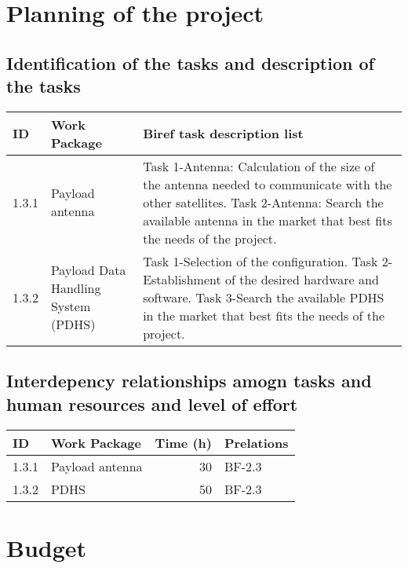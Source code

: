 \documentclass[12pt, titlepage]{article}
\begin{document}
\maketitle

\pagebreak


\section{Planning of the project}


\subsection{Identification of the tasks and description of the tasks}
\begin{tabular}{ | l | l | p{7cm} |}
\hline
ID & Work Package & Biref task description list\\ \hline
1.3.1 & Payload antenna &  Task 1-Antenna: Calculation of the size of the antenna needed to communicate with the other satellites. \newline
Task 2-Antenna: Search the available antenna in the market that best fits the needs of the project.
\\
\hline
1.3.2 & Payload Data Handling System (PDHS) &  Task 1-Selection of the configuration. \newline
Task 2-Establishment of the desired hardware and software.
\newline
Task 3-Search the available PDHS in the market that best fits the needs of the project.
\\
\hline
\end{tabular}


\subsection{Interdepency relationships amogn tasks and human resources and level of effort}
\begin{tabular}{ | l | l | r | p{5cm} | }
\hline
ID & Work Package & Time (h) & Prelations \\ \hline
1.3.1 & Payload antenna & 30 & BF-2.3 \\ \hline
1.3.2 & PDHS & 50 & BF-2.3 \\ \hline
\end{tabular}


\section{Budget}
\end{document}
